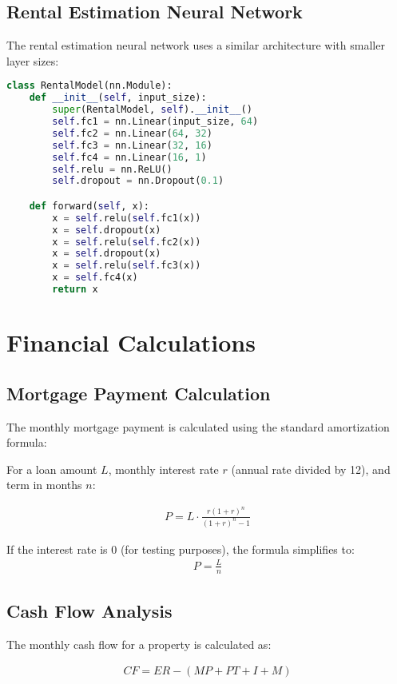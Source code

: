 \documentclass[conference]{IEEEtran}
\begin{document}
\subsection{Rental Estimation Neural Network}
The rental estimation neural network uses a similar architecture with smaller layer sizes:

\begin{lstlisting}[language=Python, caption=Rental Estimation Neural Network Architecture]
class RentalModel(nn.Module):
    def __init__(self, input_size):
        super(RentalModel, self).__init__()
        self.fc1 = nn.Linear(input_size, 64)
        self.fc2 = nn.Linear(64, 32)
        self.fc3 = nn.Linear(32, 16)
        self.fc4 = nn.Linear(16, 1)
        self.relu = nn.ReLU()
        self.dropout = nn.Dropout(0.1)

    def forward(self, x):
        x = self.relu(self.fc1(x))
        x = self.dropout(x)
        x = self.relu(self.fc2(x))
        x = self.dropout(x)
        x = self.relu(self.fc3(x))
        x = self.fc4(x)
        return x
\end{lstlisting}

\section{Financial Calculations}

\subsection{Mortgage Payment Calculation}
The monthly mortgage payment is calculated using the standard amortization formula:

For a loan amount $L$, monthly interest rate $r$ (annual rate divided by 12), and term in months $n$:

\begin{align}
P = L \cdot \frac{r(1+r)^n}{(1+r)^n-1}
\end{align}

If the interest rate is 0 (for testing purposes), the formula simplifies to:
\begin{align}
P = \frac{L}{n}
\end{align}

\subsection{Cash Flow Analysis}
The monthly cash flow for a property is calculated as:

\begin{align}
CF = ER - (MP + PT + I + M)
\end{align}
\end{document}
